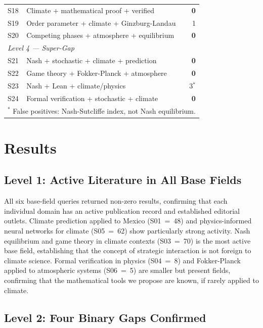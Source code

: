 \documentclass[gmd, manuscript]{copernicus}
\begin{document}
\begin{table}[ht]
\begin{tabular}{llr}
S18 & Climate + mathematical proof + verified         &   \textbf{0} \\
S19 & Order parameter + climate + Ginzburg-Landau     &   1 \\
S20 & Competing phases + atmosphere + equilibrium     &   \textbf{0} \\
\hline
\multicolumn{3}{l}{\textit{Level 4 — Super-Gap}} \\
S21 & Nash + stochastic + climate + prediction        &   \textbf{0} \\
S22 & Game theory + Fokker-Planck + atmosphere        &   \textbf{0} \\
S23 & Nash + Lean + climate/physics                   &   3$^*$ \\
S24 & Formal verification + stochastic + climate      &   \textbf{0} \\
\hline
\multicolumn{3}{l}{$^*$ False positives: Nash-Sutcliffe index,
not Nash equilibrium.} \\
\hline
\end{tabular}
\end{table}

\section{Results}

\subsection{Level 1: Active Literature in All Base Fields}

All six base-field queries returned non-zero results, confirming that
each individual domain has an active publication record and established
editorial outlets. Climate prediction applied to Mexico (S01~=~48)
and physics-informed neural networks for climate (S05~=~62) show
particularly strong activity. Nash equilibrium and game theory in climate
contexts (S03~=~70) is the most active base field, establishing that
the concept of strategic interaction is not foreign to climate science.
Formal verification in physics (S04~=~8) and Fokker-Planck applied to
atmospheric systems (S06~=~5) are smaller but present fields, confirming
that the mathematical tools we propose are known, if rarely applied to
climate.

\subsection{Level 2: Four Binary Gaps Confirmed}
\end{document}
